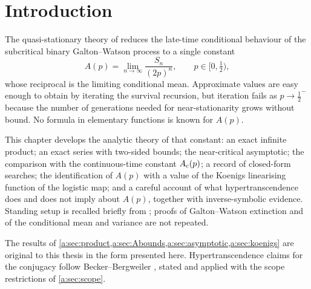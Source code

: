 \section{Introduction}
\label{a:sec:intro}

The quasi-stationary theory of \ChM reduces the late-time conditional behaviour of the
subcritical binary Galton--Watson process to a single constant
\begin{equation}
\label{a:eq:Apdef}
A(p) = \lim_{n\to\infty}\frac{S_n}{(2p)^n},
\qquad p\in[0,\tfrac12),
\end{equation}
whose reciprocal is the limiting conditional mean. Approximate values are easy enough
to obtain by iterating the survival recursion, but iteration fails as
$p\to\tfrac12^-$ because the number of generations needed for near-stationarity grows
without bound. No formula in elementary functions is known for $A(p)$.

This chapter develops the analytic theory of that constant: an exact infinite product;
an exact series with two-sided bounds; the near-critical asymptotic; the comparison with
the continuous-time constant $A_{\mathrm{c}}(p)$; a record of closed-form searches; the
identification of $A(p)$ with a value of the Koenigs linearising function of the logistic
map; and a careful account of what hypertranscendence does and does not imply about
$A(p)$, together with inverse-symbolic evidence. Standing setup is recalled briefly from
\ChM; proofs of Galton--Watson extinction and of the conditional mean and variance are
not repeated.

The results of \cref{a:sec:product,a:sec:Abounds,a:sec:asymptotic,a:sec:koenigs} are
original to this thesis in the form presented here. Hypertranscendence claims for the
conjugacy follow Becker--Bergweiler \cite{Becker1995}, stated and applied with the scope
restrictions of \cref{a:sec:scope}.
